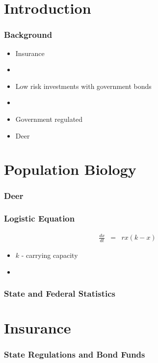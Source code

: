 


\section{Introduction}

\begin{frame}
    \frametitle{Background}
	\begin{itemize}
		\item Insurance
			\item\item Low risk investments with government bonds
			\item\item Government regulated
		\item Deer
	\end{itemize}

\end{frame}







\section{Population Biology}

\begin{frame}
    \frametitle{Deer}
\end{frame}

\begin{frame}
    \frametitle{Logistic Equation}
	\begin{eqnarray}
		\frac{dx}{dt} &=& rx(k-x)
	\end{eqnarray}
	\begin{itemize}
		\item $k$ - carrying capacity
		\item 
	\end{itemize}
\end{frame}

\begin{frame}
    \frametitle{State and Federal Statistics}
\end{frame}






\section{Insurance}

\begin{frame}
    \frametitle{State Regulations and Bond Funds}
\end{frame}



